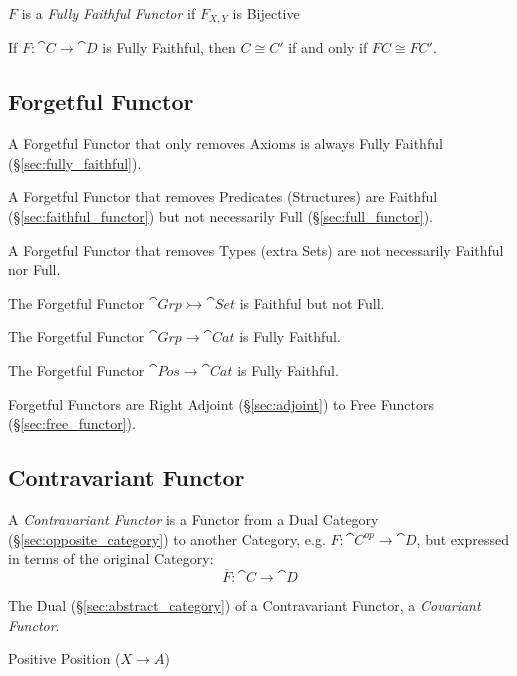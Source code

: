 $F$ is a \emph{Fully Faithful Functor} if $F_{X,Y}$ is Bijective

If $F : \cat{C} \rightarrow \cat{D}$ is Fully Faithful, then $C
\cong C'$ if and only if $FC \cong FC'$.



\subsection{Forgetful Functor}\label{sec:forgetful_functor}

A Forgetful Functor that only removes Axioms is always Fully Faithful
(\S\ref{sec:fully_faithful}).

A Forgetful Functor that removes Predicates (Structures) are Faithful
(\S\ref{sec:faithful_functor}) but not necessarily Full
(\S\ref{sec:full_functor}).

A Forgetful Functor that removes Types (extra Sets) are not
necessarily Faithful nor Full.

The Forgetful Functor $\cat{Grp} \rightarrowtail \cat{Set}$ is
Faithful but not Full.

The Forgetful Functor $\cat{Grp} \rightarrow \cat{Cat}$ is
Fully Faithful.

The Forgetful Functor $\cat{Pos} \rightarrow \cat{Cat}$ is
Fully Faithful.

Forgetful Functors are Right Adjoint (\S\ref{sec:adjoint}) to Free
Functors (\S\ref{sec:free_functor}).



\subsection{Contravariant Functor} \label{sec:contravariant_functor}

A \emph{Contravariant Functor} is a Functor from a Dual Category
(\S\ref{sec:opposite_category}) to another Category, e.g. $F :
\cat{C^{op}} \rightarrow \cat{D}$, but expressed in terms of the
original Category:
\[
  \overline{F} : \cat{C} \rightarrow \cat{D}
\]

The Dual (\S\ref{sec:abstract_category}) of a Contravariant
Functor, a \emph{Covariant Functor}.

Positive Position ($X \rightarrow A$)

